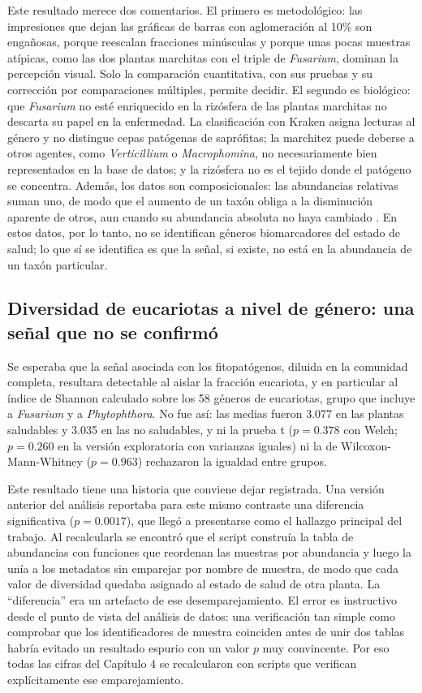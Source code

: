 Este resultado merece dos comentarios. El primero es metodológico: las impresiones que dejan las
gráficas de barras con aglomeración al 10\% son engañosas, porque reescalan fracciones minúsculas y
porque unas pocas muestras atípicas, como las dos plantas marchitas con el triple de \textit{Fusarium},
dominan la percepción visual. Solo la comparación cuantitativa, con sus pruebas y su corrección por
comparaciones múltiples, permite decidir. El segundo es biológico: que \textit{Fusarium} no esté
enriquecido en la rizósfera de las plantas marchitas no descarta su papel en la enfermedad. La
clasificación con Kraken asigna lecturas al género y no distingue cepas patógenas de saprófitas; la
marchitez puede deberse a otros agentes, como \textit{Verticillium} o \textit{Macrophomina}, no
necesariamente bien representados en la base de datos; y la rizósfera no es el tejido donde el
patógeno se concentra. Además, los datos son composicionales: las abundancias relativas suman uno,
de modo que el aumento de un taxón obliga a la disminución aparente de otros, aun cuando su
abundancia absoluta no haya cambiado \citep{gloor2017microbiome, calle2019statistical}. En estos
datos, por lo tanto, no se identifican géneros biomarcadores del estado de salud; lo que sí se
identifica es que la señal, si existe, no está en la abundancia de un taxón particular.

\subsection{Diversidad de eucariotas a nivel de género: una señal que no se confirmó}

Se esperaba que la señal asociada con los fitopatógenos, diluida en la comunidad completa, resultara
detectable al aislar la fracción eucariota, y en particular al índice de Shannon calculado sobre los
58 géneros de eucariotas, grupo que incluye a \textit{Fusarium} y a \textit{Phytophthora}. No fue
así: las medias fueron 3.077 en las plantas saludables y 3.035 en las no saludables, y ni la prueba
t ($p = 0.378$ con Welch; $p = 0.260$ en la versión exploratoria con varianzas iguales) ni la de Wilcoxon-Mann-Whitney
($p = 0.963$) rechazaron la igualdad entre grupos.

Este resultado tiene una historia que conviene dejar registrada. Una versión anterior del análisis
reportaba para este mismo contraste una diferencia significativa ($p = 0.0017$), que llegó a
presentarse como el hallazgo principal del trabajo. Al recalcularla se encontró que el script
construía la tabla de abundancias con funciones que reordenan las muestras por abundancia y luego la
unía a los metadatos sin emparejar por nombre de muestra, de modo que cada valor de diversidad
quedaba asignado al estado de salud de otra planta. La ``diferencia'' era un artefacto de ese
desemparejamiento. El error es instructivo desde el punto de vista del análisis de datos: una
verificación tan simple como comprobar que los identificadores de muestra coinciden antes de unir
dos tablas habría evitado un resultado espurio con un valor $p$ muy convincente. Por eso todas las
cifras del Capítulo 4 se recalcularon con scripts que verifican explícitamente ese emparejamiento.

